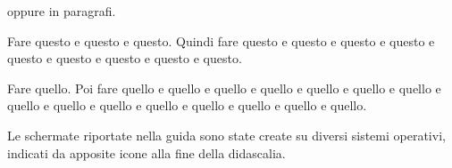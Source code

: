 oppure in paragrafi.

\nix{} \osx{}Fare questo e questo e questo. Quindi fare questo e questo e questo e questo e questo e questo
e questo e questo e questo.

\win{}Fare quello. Poi fare quello e quello e quello e quello e quello e quello e quello e quello e quello e
quello e quello e quello e quello e quello e quello.

Le schermate riportate nella guida sono state create su diversi sistemi operativi, indicati da apposite icone alla fine della didascalia.
